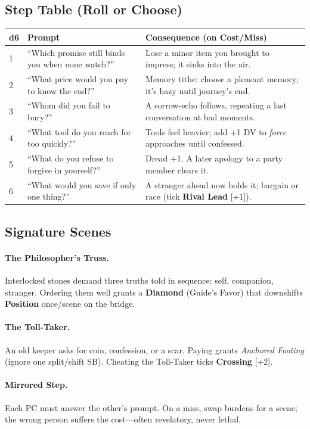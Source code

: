 \documentclass[11pt]{article}
\newcommand{\Clock}[2]{\textbf{#1} [#2]}
\newcommand{\Term}[1]{\textbf{#1}}
\newcommand{\Position}{\Term{Position}}
\newcommand{\Diamond}{\Term{Diamond}}
\begin{document}
\subsection*{Step Table (Roll or Choose)}
\begin{tabularx}{\linewidth}{@{}l X X@{}}
\toprule
\textbf{d6} & \textbf{Prompt} & \textbf{Consequence (on Cost/Miss)}\\
\midrule
1 & ``Which promise still binds you when none watch?'' & Lose a minor item you brought to impress; it sinks into the air.\\
2 & ``What price would you pay to know the end?'' & Memory tithe: choose a pleasant memory; it's hazy until journey's end.\\
3 & ``Whom did you fail to bury?'' & A sorrow-echo follows, repeating a last conversation at bad moments.\\
4 & ``What tool do you reach for too quickly?'' & Tools feel heavier; add +1 DV to \emph{force} approaches until confessed.\\
5 & ``What do you refuse to forgive in yourself?'' & Dread +1. A later apology to a party member clears it.\\
6 & ``What would you save if only one thing?'' & A stranger ahead now holds it; bargain or race (tick \Clock{Rival Lead}{+1}).\\
\bottomrule
\end{tabularx}

\subsection*{Signature Scenes}
\paragraph{The Philosopher's Truss.} Interlocked stones demand three truths told in sequence: self, companion, stranger. Ordering them well grants a \Diamond{} (Guide's Favor) that downshifts \Position{} once/scene on the bridge.

\paragraph{The Toll-Taker.} An old keeper asks for coin, confession, or a scar. Paying grants \emph{Anchored Footing} (ignore one split/shift SB). Cheating the Toll-Taker ticks \Clock{Crossing}{+2}.

\paragraph{Mirrored Step.} Each PC must answer the other's prompt. On a miss, swap burdens for a scene; the wrong person suffers the cost---often revelatory, never lethal.
\end{document}
